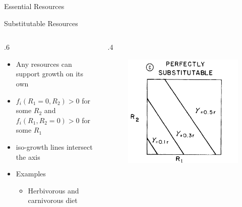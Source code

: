 \documentclass[final,xcolor=dvipsnames]{beamer}
\begin{document}
\begin{frame}[allowframebreaks]{Essential Resources}
\end{frame}


\begin{frame}{Substitutable Resources}
  \begin{columns}
  \begin{column}{.6\framewidth}
   \begin{itemize}
   \item Any resources can support growth on its own 
   \item $f_i(R_1=0,R_2)> 0$ for some $R_2$ and $f_i(R_1,R_2=0)> 0$ for some $R_1$
   \item iso-growth lines intersect the axis
   \item Examples
   \begin{itemize}
   \item Herbivorous and carnivorous diet
   \end{itemize}
   \end{itemize}
  \end{column}
  \begin{column}{.4\framewidth}
    \begin{figure}
       \includegraphics[width=.4\framewidth]{PerfectlySubst1}
    \end{figure}
  \end{column}
 \end{columns}
\end{frame}
\end{document}
